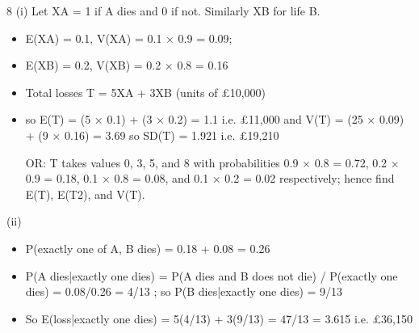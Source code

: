 \documentclass[a4paper,12pt]{article}
\begin{document}
8 (i) Let XA = 1 if A dies and 0 if not. Similarly XB for life B.
\begin{itemize}
    \item E(XA) = 0.1, V(XA) = 0.1 × 0.9 = 0.09;
\item E(XB) = 0.2, V(XB) = 0.2 × 0.8 = 0.16
\item Total losses T = 5XA + 3XB (units of £10,000)
\item so E(T) = (5 × 0.1) + (3 × 0.2) = 1.1 i.e. £11,000
and V(T) = (25 × 0.09) + (9 × 0.16) = 3.69 so SD(T) = 1.921
i.e. £19,210
\item [OR: T takes values 0, 3, 5, and 8 with probabilities 0.9 × 0.8 = 0.72, 0.2 ×
0.9 = 0.18, 0.1 × 0.8 = 0.08, and 0.1 × 0.2 = 0.02 respectively; hence find
E(T), E(T2), and V(T).]
\end{itemize}


(ii) 

\begin{itemize}
    \item P(exactly one of A, B dies) = 0.18 + 0.08 = 0.26
\item P(A dies|exactly one dies) = P(A dies and B does not die) / P(exactly one dies)
= 0.08/0.26 = 4/13 ; so P(B dies|exactly one dies) = 9/13
\item So E(loss|exactly one dies) = 5(4/13) + 3(9/13) = 47/13 = 3.615
i.e. £36,150
\end{itemize}
\end{document}
